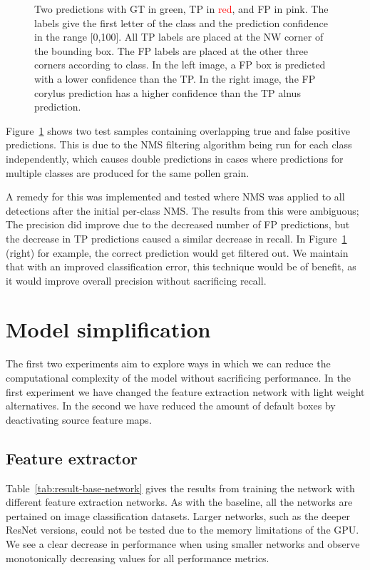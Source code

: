 \begin{figure}[htbp]
\begin{subfigure}[t]{0.4\textwidth}
  \end{subfigure}
  \caption[Predictions showing TP overlapped by FP from different class]{Two predictions with GT in \textcolor{nicegreen}{green}, TP in \textcolor{red}{red}, and FP in \textcolor{nicepink}{pink}.
The labels give the first letter of the class and the prediction confidence in the range [0,100].
All TP labels are placed at the NW corner of the bounding box.
The FP labels are placed at the other three corners according to class.
In the left image, a FP box is predicted with a lower confidence than the TP\@.
In the right image, the FP corylus prediction has a higher confidence than the TP alnus prediction.}\label{fig:results-overlapping-predictions}
\end{figure}

Figure~\ref{fig:results-overlapping-predictions} shows two test samples containing overlapping true and false positive predictions.
This is due to the NMS filtering algorithm being run for each class independently, which causes double predictions in cases where predictions for multiple classes are produced for the same pollen grain.

A remedy for this was implemented and tested where NMS was applied to all detections after the initial per-class NMS\@.
The results from this were ambiguous; The precision did improve due to the decreased number of FP predictions, but the decrease in TP predictions caused a similar decrease in recall.
In Figure~\ref{fig:results-overlapping-predictions} (right) for example, the correct prediction would get filtered out.
We maintain that with an improved classification error, this technique would be of benefit, as it would improve overall precision without sacrificing recall.

\section{Model simplification}\label{sec:results-simplification}
The first two experiments aim to explore ways in which we can reduce the computational complexity of the model without sacrificing performance.
In the first experiment we have changed the feature extraction network with light weight alternatives.
In the second we have reduced the amount of default boxes by deactivating source feature maps.

\subsection{Feature extractor}
Table~\ref{tab:result-base-network} gives the results from training the network with different feature extraction networks.
As with the baseline, all the networks are pertained on image classification datasets.
Larger networks, such as the deeper ResNet versions, could not be tested due to the memory limitations of the GPU\@.
We see a clear decrease in performance when using smaller networks and observe monotonically decreasing values for all performance metrics.

